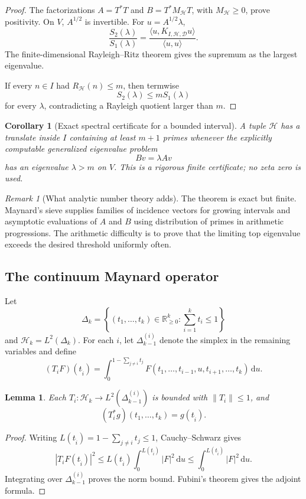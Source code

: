 \documentclass[11pt]{article}
\newtheorem{lemma}[theorem]{Lemma}
\newtheorem{corollary}[theorem]{Corollary}
\theoremstyle{definition}
\theoremstyle{remark}
\newtheorem{remark}[theorem]{Remark}
\newcommand{\RR}{\mathbb R}
\newcommand{\HH}{\mathcal H}
\newcommand{\dd}{\,\mathrm d}
\newcommand{\1}{\mathbf 1}
\newcommand{\cH}{\mathcal H}
\newcommand{\cD}{\mathscr D}
\begin{document}
\begin{proof}
The factorizations $A=T^*T$ and $B=T^*M_{\cH}T$, with $M_{\cH}\geq0$, prove positivity.  On $V$, $A^{1/2}$ is invertible.  For $u=A^{1/2}\lambda$,
\[
\frac{S_2(\lambda)}{S_1(\lambda)}
=
\frac{\langle u,K_{I,\cH,\cD}u\rangle}{\langle u,u\rangle}.
\]
The finite-dimensional Rayleigh--Ritz theorem gives the supremum as the largest eigenvalue.

If every $n\in I$ had $R_{\cH}(n)\leq m$, then termwise
\[
S_2(\lambda)\leq mS_1(\lambda)
\]
for every $\lambda$, contradicting a Rayleigh quotient larger than $m$.
\end{proof}

\begin{corollary}[Exact spectral certificate for a bounded interval]
A tuple $\cH$ has a translate inside $I$ containing at least $m+1$ primes whenever the explicitly computable generalized eigenvalue problem
\[
Bv=\lambda Av
\]
has an eigenvalue $\lambda>m$ on $V$.  This is a rigorous finite certificate; no zeta zero is used.
\end{corollary}

\begin{remark}[What analytic number theory adds]
The theorem is exact but finite.  Maynard's sieve supplies families of incidence vectors for growing intervals and asymptotic evaluations of $A$ and $B$ using distribution of primes in arithmetic progressions.  The arithmetic difficulty is to prove that the limiting top eigenvalue exceeds the desired threshold uniformly often.
\end{remark}

\subsection{The continuum Maynard operator}

Let
\[
\Delta_k=\left\{(t_1,\ldots,t_k)\in\RR_{\geq0}^k:\sum_{i=1}^kt_i\leq1\right\}
\]
and $\HH_k=L^2(\Delta_k)$.  For each $i$, let $\Delta_{k-1}^{(i)}$ denote the simplex in the remaining variables and define
\[
(T_iF)(t_{\widehat i})
=
\int_0^{1-\sum_{j\neq i}t_j}
F(t_1,\ldots,t_{i-1},u,t_{i+1},\ldots,t_k)\dd u.
\]

\begin{lemma}
Each $T_i:\HH_k\to L^2(\Delta_{k-1}^{(i)})$ is bounded with $\|T_i\|\leq1$, and
\[
(T_i^*g)(t_1,\ldots,t_k)=g(t_{\widehat i}).
\]
\end{lemma}

\begin{proof}
Writing $L(t_{\widehat i})=1-\sum_{j\neq i}t_j\leq1$, Cauchy--Schwarz gives
\[
|T_iF(t_{\widehat i})|^2
\leq L(t_{\widehat i})
\int_0^{L(t_{\widehat i})}|F|^2\dd u
\leq
\int_0^{L(t_{\widehat i})}|F|^2\dd u.
\]
Integrating over $\Delta_{k-1}^{(i)}$ proves the norm bound.  Fubini's theorem gives the adjoint formula.
\end{proof}
\end{document}
